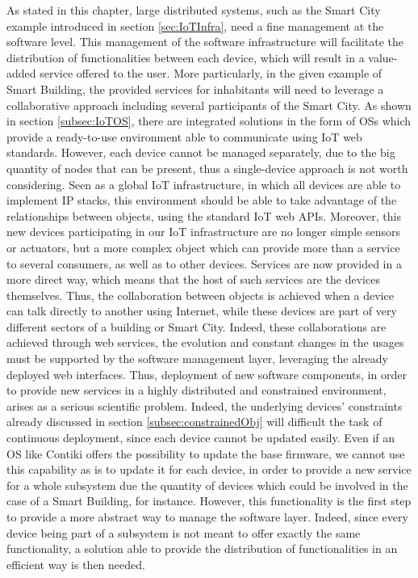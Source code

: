 As stated in this chapter, large distributed systems, such as the Smart City example introduced in section \ref{sec:IoTInfra}, need a fine management at the software level.
This management of the software infrastructure will facilitate the distribution of functionalities between each device, which will result in a value-added service offered to the user.
More particularly, in the given example of Smart Building, the provided services for inhabitants will need to leverage a collaborative approach including several participants of the Smart City.
As shown in section \ref{subsec:IoTOS}, there are integrated solutions in the form of OSs which provide a ready-to-use environment able to communicate using IoT web standards.
However, each device cannot be managed separately, due to the big quantity of nodes that can be present, thus a single-device approach is not worth considering.
Seen as a global IoT infrastructure, in which all devices are able to implement IP stacks, this environment should be able to take advantage of the relationships between objects, using the standard IoT web APIs.
Moreover, this new devices participating in our IoT infrastructure are no longer simple sensors or actuators, but a more complex object which can provide more than a service to several consumers, as well as to other devices.
Services are now provided in a more direct way, which means that the host of such services are the devices themselves.
Thus, the collaboration between objects is achieved when a device can talk directly to another using Internet, while these devices are part of very different sectors of a building or Smart City.
Indeed, these collaborations are achieved through web services, the evolution and constant changes in the usages must be supported by the software management layer, leveraging the already deployed web interfaces.
Thus, deployment of new software components, in order to provide new services in a highly distributed and constrained environment, arises as a serious scientific problem.
Indeed, the underlying devices' constraints already discussed in section \ref{subsec:constrainedObj} will difficult the task of continuous deployment, since each device cannot be updated easily.
Even if an OS like Contiki offers the possibility to update the base firmware, we cannot use this capability as is to update it for each device, in order to provide a new service for a whole subsystem due the quantity of devices which could be involved in the case of a Smart Building, for instance.
However, this functionality is the first step to provide a more abstract way to manage the software layer.
Indeed, since every device being part of a subsystem is not meant to offer exactly the same functionality, a solution able to provide the distribution of functionalities in an efficient way is then needed.

